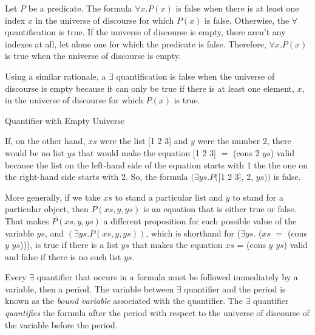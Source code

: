 \begin{aside}
Let $P$ be a predicate.
The formula $\forall x.P(x)$ is false when there is
at least one index $x$ in the universe of discourse
for which $P(x)$ is false.
Otherwise, the $\forall$ quantification is true.
If the universe of discourse is empty,
there aren't any indexes at all,
let alone one for which the predicate is false.
Therefore, $\forall x.P(x)$ is true
when the universe of discourse is empty.

Using a similar rationale, a $\exists$ quantification
is false when the universe of discourse is empty
because it can only be true if there is
at least one element, $x$, in the universe of discourse
for which $P(x)$ is true.
\caption{Quantifier with Empty Universe}
\label{empty-forall}
\end{aside}

If, on the other hand, $xs$ were the list [1 2 3]
and $y$ were the number 2, there would be no list
$ys$ that would make the equation [1 2 3] $=$ (cons $2$ $ys$) valid
because the list on the left-hand side of the equation
starts with 1 the the one on the right-hand side starts with 2.
So, the formula $(\exists ys.P($[1 2 3], 2, $ys))$
is false.

More generally, if we take $xs$ to stand a particular list
and $y$ to stand for a particular object, then
$P(xs, y, ys)$ is an equation that is either true or false.
That makes $P(xs, y, ys)$ a different proposition
for each possible value of the variable $ys$,
and $(\exists ys.P(xs, y, ys))$, which is
shorthand for
($\exists ys.$ ($xs$ $=$ (cons $y$ $ys$))),
is true if there is a list $ys$ that makes the
equation $xs$ = (cons $y$ $ys$) valid and false if there is no such list $ys$.

Every $\exists$ quantifier that occurs in a formula must be
followed immediately by a variable, then a period.
The variable between $\exists$ quantifier and the period is known as the
\label{bound-var-def}
\emph{bound variable}
associated with the quantifier.
The $\exists$ quantifier \emph{quantifies} the formula after the period
with respect to the universe of discourse of the variable before the period.

